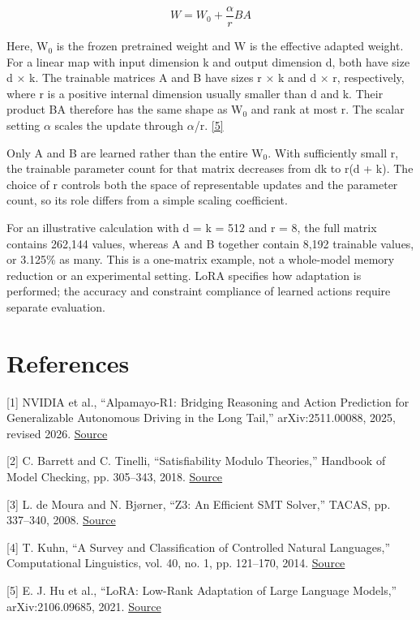 \documentclass[11pt,a4paper]{article}
\begin{document}
\[W = W_0 + \frac{\alpha}{r}BA\]

Here, W\ensuremath{{}_0} is the frozen pretrained weight and W is the effective adapted weight. For a linear map with input dimension k and output dimension d, both have size d × k. The trainable matrices A and B have sizes r × k and d × r, respectively, where r is a positive internal dimension usually smaller than d and k. Their product BA therefore has the same shape as W\ensuremath{{}_0} and rank at most r. The scalar setting \ensuremath{\alpha} scales the update through \ensuremath{\alpha}/r. \href{\detokenize{https://arxiv.org/abs/2106.09685}}{[5]}\par

Only A and B are learned rather than the entire W\ensuremath{{}_0}. With sufficiently small r, the trainable parameter count for that matrix decreases from dk to r(d + k). The choice of r controls both the space of representable updates and the parameter count, so its role differs from a simple scaling coefficient.\par

For an illustrative calculation with d = k = 512 and r = 8, the full matrix contains 262,144 values, whereas A and B together contain 8,192 trainable values, or 3.125\% as many. This is a one-matrix example, not a whole-model memory reduction or an experimental setting. LoRA specifies how adaptation is performed; the accuracy and constraint compliance of learned actions require separate evaluation.\par

\section*{References}

[1] NVIDIA et al., “Alpamayo-R1: Bridging Reasoning and Action Prediction for Generalizable Autonomous Driving in the Long Tail,” arXiv:2511.00088, 2025, revised 2026. \href{\detokenize{https://arxiv.org/abs/2511.00088}}{Source}\par

[2] C. Barrett and C. Tinelli, “Satisfiability Modulo Theories,” Handbook of Model Checking, pp. 305–343, 2018. \href{\detokenize{https://theory.stanford.edu/~barrett/pubs/BT18.pdf}}{Source}\par

[3] L. de Moura and N. Bjørner, “Z3: An Efficient SMT Solver,” TACAS, pp. 337–340, 2008. \href{\detokenize{https://doi.org/10.1007/978-3-540-78800-3_24}}{Source}\par

[4] T. Kuhn, “A Survey and Classification of Controlled Natural Languages,” Computational Linguistics, vol. 40, no. 1, pp. 121–170, 2014. \href{\detokenize{https://aclanthology.org/J14-1005/}}{Source}\par

[5] E. J. Hu et al., “LoRA: Low-Rank Adaptation of Large Language Models,” arXiv:2106.09685, 2021. \href{\detokenize{https://arxiv.org/abs/2106.09685}}{Source}\par
\end{document}
